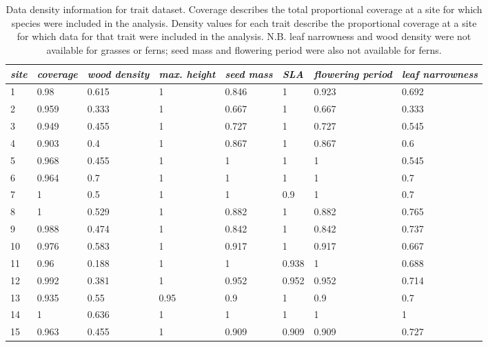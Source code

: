 \documentclass[openright,12pt,a4paper]{memoir}
\begin{document}
\doublespacing

\begin{landscape}
\begin{table}[ht]
\tiny
\centering
\caption[Data density information for trait dataset.]{\small{Data density information for trait dataset. Coverage describes the total proportional coverage at a site for which species were included in the analysis. Density values for each trait describe the proportional coverage at a site for which data for that trait were included in the analysis. N.B. leaf narrowness and wood density were not available for grasses or ferns; seed mass and flowering period were also not available for ferns.}} \\
\label{Ch3sup2_T1} \\
{\tabulinesep=1.2mm
\begin{tabu} to \linewidth {XXXXXXXX}
\hline
\textit{site} & \textit{coverage} & \textit{wood density} & \textit{max. height} & \textit{seed mass} & \textit{SLA} & \textit{flowering period} & \textit{leaf narrowness} \\
 & 0.98 & 0.615 & 1 & 0.846 & 1 & 0.923 & 0.692 \\
2 & 0.959 & 0.333 & 1 & 0.667 & 1 & 0.667 & 0.333 \\
3 & 0.949 & 0.455 & 1 & 0.727 & 1 & 0.727 & 0.545 \\
4 & 0.903 & 0.4 & 1 & 0.867 & 1 & 0.867 & 0.6 \\
5 & 0.968 & 0.455 & 1 & 1 & 1 & 1 & 0.545 \\
6 & 0.964 & 0.7 & 1 & 1 & 1 & 1 & 0.7 \\
7 & 1 & 0.5 & 1 & 1 & 0.9 & 1 & 0.7 \\
8 & 1 & 0.529 & 1 & 0.882 & 1 & 0.882 & 0.765 \\
9 & 0.988 & 0.474 & 1 & 0.842 & 1 & 0.842 & 0.737 \\
10 & 0.976 & 0.583 & 1 & 0.917 & 1 & 0.917 & 0.667 \\
11 & 0.96 & 0.188 & 1 & 1 & 0.938 & 1 & 0.688 \\
12 & 0.992 & 0.381 & 1 & 0.952 & 0.952 & 0.952 & 0.714 \\
13 & 0.935 & 0.55 & 0.95 & 0.9 & 1 & 0.9 & 0.7 \\
14 & 1 & 0.636 & 1 & 1 & 1 & 1 & 1 \\
15 & 0.963 & 0.455 & 1 & 0.909 & 0.909 & 0.909 & 0.727 \\
\hline
\end{tabu}}
\end{table}
\end{landscape}
\clearpage
\end{document}
